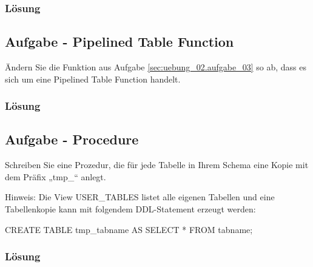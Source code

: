 \subsubsection*{Lösung}
\label{sec:uebung_02.aufgabe_03.loesung}


\subsection{Aufgabe - Pipelined Table Function}
\label{sec:uebung_02.aufgabe_04}
Ändern Sie die Funktion aus Aufgabe \ref{sec:uebung_02.aufgabe_03} so ab, dass es sich um eine Pipelined Table Function handelt.

\subsubsection*{Lösung}
\label{sec:uebung_02.aufgabe_04.loesung}


\subsection{Aufgabe - Procedure}
\label{sec:uebung_02.aufgabe_05}
Schreiben Sie eine Prozedur, die für jede Tabelle in Ihrem Schema eine Kopie mit dem Präfix „tmp\_“ anlegt.

Hinweis: Die View USER\_TABLES listet alle eigenen Tabellen und eine Tabellenkopie kann mit folgendem DDL-Statement erzeugt werden:
\begin{sqlcode}
CREATE TABLE tmp_tabname AS
  SELECT *
  FROM tabname;
\end{sqlcode}

\subsubsection*{Lösung}
\label{sec:uebung_02.aufgabe_05.loesung}


